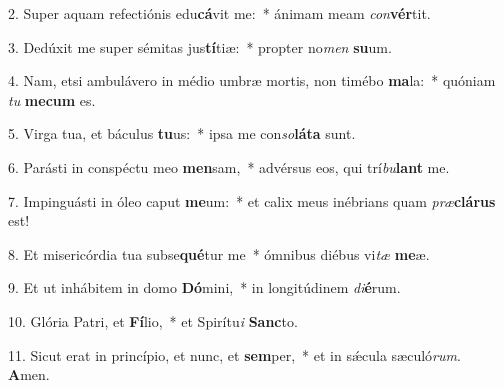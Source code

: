 2. Super aquam refectiónis edu\textbf{cá}vit me:~*  ánimam meam \textit{con}\textbf{vér}tit.\

3. Dedúxit me super sémitas jus\textbf{tí}tiæ:~*  propter no\textit{men} \textbf{su}um.\

4. Nam, etsi ambulávero in médio umbræ mortis, non timébo \textbf{ma}la:~*  quóniam \textit{tu} \textbf{me}\textbf{cum} es.\

5. Virga tua, et báculus \textbf{tu}us:~*  ipsa me con\textit{so}\textbf{lá}\textbf{ta} sunt.\

6. Parásti in conspéctu meo \textbf{men}sam,~*  advérsus eos, qui trí\textit{bu}\textbf{lant} me.\

7. Impinguásti in óleo caput \textbf{me}um:~*  et calix meus inébrians quam \textit{præ}\textbf{clá}\textbf{rus} est!\

8. Et misericórdia tua subse\textbf{qué}tur me~*  ómnibus diébus vi\textit{tæ} \textbf{me}æ.\

9. Et ut inhábitem in domo \textbf{Dó}mini,~*  in longitúdinem \textit{di}\textbf{é}rum.\

10. Glória Patri, et \textbf{Fí}lio,~*  et Spirítu\textit{i} \textbf{Sanc}to.\

11. Sicut erat in princípio, et nunc, et \textbf{sem}per,~*  et in sǽcula sæculó\textit{rum}. \textbf{A}men.\

